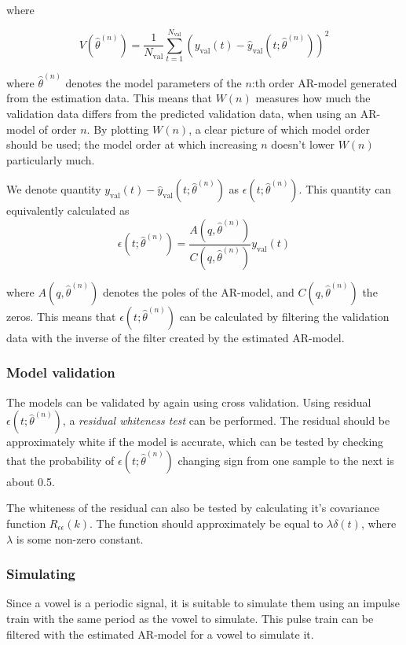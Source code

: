 \documentclass{IEEEtran}
\newcommand{\val}[1]{#1_{\text{val}}}
\begin{document}
where

\begin{equation}
    V(\hat{\theta}^{(n)}) = \frac{1}{\val{N}}\sum^{\val{N}}_{t=1}(\val{y}(t) -
        \val{\hat{y}}(t;\hat{\theta}^{(n)}))^2
\end{equation}

where $\hat{\theta}^{(n)}$ denotes the model parameters of the $n$:th order
AR-model generated from the estimation data. This means that $W(n)$ measures
how much the validation data differs from the predicted validation data, when
using an AR-model of order $n$. By plotting $W(n)$, a
clear picture of which model order should be used; the model order at which
increasing $n$ doesn't lower $W(n)$ particularly much.

We denote quantity $\val{y}(t) - \val{\hat{y}}(t;\hat{\theta}^{(n)})$ as
$\epsilon(t;\hat{\theta}^{(n)})$. This quantity can equivalently calculated
as
\begin{equation}
    \epsilon(t;\hat{\theta}^{(n)}) =
    \frac{A(q,\hat{\theta}^{(n)})}{C(q,\hat{\theta}^{(n)})}\val{y}(t)
\end{equation}

where $A(q,\hat{\theta}^{(n)})$ denotes the poles of the AR-model, and
$C(q,\hat{\theta}^{(n)})$ the zeros. This means that
$\epsilon(t;\hat{\theta}^{(n)})$ can be calculated by filtering the validation
data with the inverse of the filter created by the estimated AR-model.

\subsubsection{Model validation}
The models can be validated by again using cross validation. Using residual
$\epsilon(t;\hat{\theta}^{(n)})$, a \textit{residual whiteness test} can be
performed. The residual should be approximately white if the model is accurate,
which can be tested by checking that the probability of
$\epsilon(t;\hat{\theta}^{(n)})$ changing sign from one sample to the next is
about 0.5.

The whiteness of the residual can also be tested by calculating it's covariance
function $R_{\epsilon\epsilon}(k)$. The function should approximately be equal
to $\lambda\delta(t)$, where $\lambda$ is some non-zero constant.

\subsubsection{Simulating}
Since a vowel is a periodic signal, it is suitable to simulate them using an
impulse train with the same period as the vowel to simulate. This pulse train
can be filtered with the estimated AR-model for a vowel to simulate it.
\end{document}
